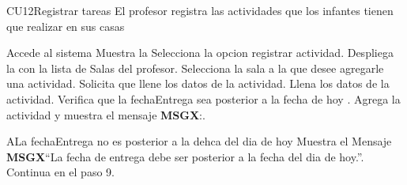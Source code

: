 
	\begin{UseCase}{CU12}{Registrar tareas}{
		El profesor registra las actividades que los infantes tienen que realizar en sus casas
	}
	\end{UseCase}
	\begin{UCtrayectoria}
		
		\UCpaso[\UCactor] Accede al sistema
		\UCpaso Muestra la 
		\UCpaso[\UCactor] Selecciona la opcion registrar actividad.
		\UCpaso Despliega la  con la lista de Salas del profesor.
		\UCpaso[\UCactor] Selecciona la sala a la que desee agregarle una actividad.
		\UCpaso Solicita que llene los datos de la actividad.
		\UCpaso[\UCactor] Llena los datos de la actividad.
            \UCpaso Verifica que la fechaEntrega sea posterior a la fecha de hoy .
		\UCpaso Agrega la actividad y muestra el mensaje {\bf MSGX}:.		
	\end{UCtrayectoria}

		\begin{UCtrayectoriaA}{A}{La fechaEntrega no es posterior a la dehca del dia de hoy}
			\UCpaso Muestra el Mensaje {\bf MSGX}``La fecha de entrega debe ser posterior a la fecha del dia de hoy.''.
			\UCpaso Continua en el paso 9.
		\end{UCtrayectoriaA}
		
		
